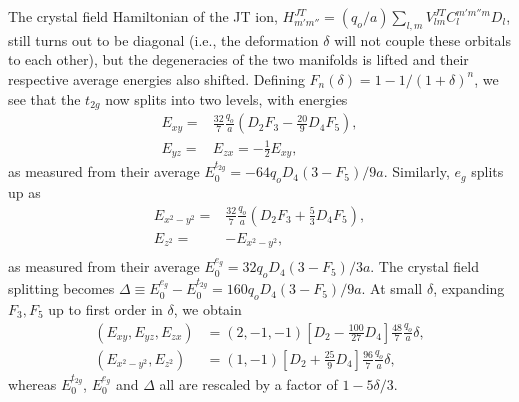 \documentclass[a4paper,prb,twocolumn]{revtex4-1}  %
\newcommand{\com}[1]{}
\begin{document}
The crystal field Hamiltonian of the JT ion,
${H_{m' m''}^{JT} = (q_o/a)\sum_{l,m} V_{lm}^{JT} C_{l}^{m'm''m} D_{l}}$,
still turns out to be diagonal 
(i.e., the deformation $\delta$
will not couple these orbitals to each other),
but the degeneracies of the two manifolds is lifted
and their respective average energies also shifted.
Defining 
$F_n(\delta) = 1-1/(1+\delta)^n$,
we see that
the $t_{2g}$ now splits into two levels,
with energies
\begin{align}
E_{xy} =&
\frac{32}{7}\frac{q_o}{a} \left(
 D_2F_3 - \frac{20}{9}D_4F_5 
\right),\\
E_{yz} =& E_{zx} = -\frac{1}{2} E_{xy},
\end{align}
as measured from their average 
$E_0^{t_{2g}} = -64q_oD_4 \left(3-F_5\right)/9a$.
Similarly, $e_g$ splits up as
\begin{align}
E_{x^2-y^2}=&
\frac{32}{7}\frac{q_o}{a} \left(D_2F_3+\frac{5}{3} D_4F_5\right),\\
E_{z^2}=&-E_{x^2-y^2},\\
\end{align}
as measured from their average 
$E_0^{e_{g}} = 32 q_oD_4 \left(3-F_5\right)/3a$.
The crystal field splitting becomes
$\Delta \equiv E_0^{e_{g}}-E_0^{t_{2g}}=
160q_oD_4\left(3-F_5\right)/9a$.
At small $\delta$, 
expanding 
$F_3,F_5$
 up to first order in $\delta$,
we obtain
\begin{align}
\label{eq:JTt2g}
(E_{xy},E_{yz},E_{zx})&= (2, -1, -1)
\left[D_2-\frac{100}{27}  D_4\right]\frac{48}{7}\frac{q_o}{a}\delta,\\
\label{eq:JTeg}
(E_{x^2-y^2},E_{z^2})&=(1,-1)
\left[D_2+\frac{25}{9} D_4\right]\frac{96}{7}\frac{q_o}{a}\delta,
\end{align}
whereas
$E_0^{t_{2g}}$, $E_0^{e_{g}}$ and $\Delta$ all are rescaled by a factor of ${1-5\delta/3}$.


\com{
The crystal field splitting becomes
\begin{align}
E_0^{t_{2g}},E_0^{e_{g}},\Delta \to (1-\frac{5}{3}\delta)E_0^{t_{2g}}
E_0^{e_{g}} \to (1-\frac{5}{3}\delta) E_0^{e_{g}}
\Delta \to (1-\frac{5}{3}\delta)\Delta
\end{align}
}
\end{document}
